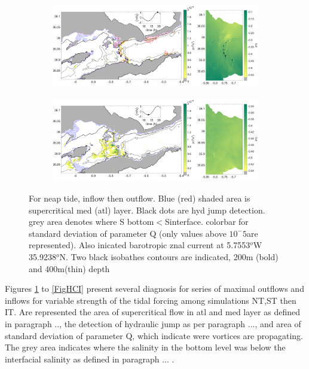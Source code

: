 \begin{figure}[!h]
 \centering
 
 \begin{subfigure}{\linewidth}
\centering
\includegraphics[width=1\linewidth]{./GBR3D/ME2_19h_p.png}
\end{subfigure}
 
 \begin{subfigure}{\linewidth}
\centering
\includegraphics[width=\linewidth]{./GBR3D/ME2_13h_p.png}
\end{subfigure}
\caption {For neap tide, inflow then outflow. Blue (red) shaded area is supercritical med (atl) layer. Black dots are hyd jump detection. grey area denotes where S bottom$<$Sinterface. colorbar for standard deviation of parameter Q (only values above $10^-5$are represented). Also inicated barotropic znal current at 5.7553$^o$W  35.9238$^o$N. Two black isobathes contours are indicated, 200m (bold) and 400m(thin) depth  }
\label{FigHCN}
\end{figure}

Figures \ref{FigHCN} to \ref{FigHCI} present several diagnosis for series of maximal outflows and inflows for variable strength of the tidal forcing among simulations NT,ST then IT. Are represented the area of supercritical flow in atl and med layer as defined in paragraph .., the detection of hydraulic jump as per paragraph ..., and area of standard deviation of parameter Q, which indicate were vortices are propagating. The grey area indicates where the salinity in the bottom level was below the interfacial salinity as defined in paragraph ... .

